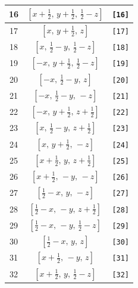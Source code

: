 \documentclass[fleqn,8pt]{jsarticle}
\begin{document}
\begin{longtable}{ccc}
16 & $\left[ x + \frac{1}{2},\, y + \frac{1}{2},\, \frac{1}{2} - z \right]$ & {\tt [16]} \\ \hline
17 & $\left[ x,\, y + \frac{1}{2},\, z \right]$ & {\tt [17]} \\ \hline
18 & $\left[ x,\, \frac{1}{2} - y,\, \frac{1}{2} - z \right]$ & {\tt [18]} \\ \hline
19 & $\left[ - x,\, y + \frac{1}{2},\, \frac{1}{2} - z \right]$ & {\tt [19]} \\ \hline
20 & $\left[ - x,\, \frac{1}{2} - y,\, z \right]$ & {\tt [20]} \\ \hline
21 & $\left[ - x,\, \frac{1}{2} - y,\, - z \right]$ & {\tt [21]} \\ \hline
22 & $\left[ - x,\, y + \frac{1}{2},\, z + \frac{1}{2} \right]$ & {\tt [22]} \\ \hline
23 & $\left[ x,\, \frac{1}{2} - y,\, z + \frac{1}{2} \right]$ & {\tt [23]} \\ \hline
24 & $\left[ x,\, y + \frac{1}{2},\, - z \right]$ & {\tt [24]} \\ \hline
25 & $\left[ x + \frac{1}{2},\, y,\, z + \frac{1}{2} \right]$ & {\tt [25]} \\ \hline
26 & $\left[ x + \frac{1}{2},\, - y,\, - z \right]$ & {\tt [26]} \\ \hline
27 & $\left[ \frac{1}{2} - x,\, y,\, - z \right]$ & {\tt [27]} \\ \hline
28 & $\left[ \frac{1}{2} - x,\, - y,\, z + \frac{1}{2} \right]$ & {\tt [28]} \\ \hline
29 & $\left[ \frac{1}{2} - x,\, - y,\, \frac{1}{2} - z \right]$ & {\tt [29]} \\ \hline
30 & $\left[ \frac{1}{2} - x,\, y,\, z \right]$ & {\tt [30]} \\ \hline
31 & $\left[ x + \frac{1}{2},\, - y,\, z \right]$ & {\tt [31]} \\ \hline
32 & $\left[ x + \frac{1}{2},\, y,\, \frac{1}{2} - z \right]$ & {\tt [32]} \\
\end{longtable}
\end{document}
